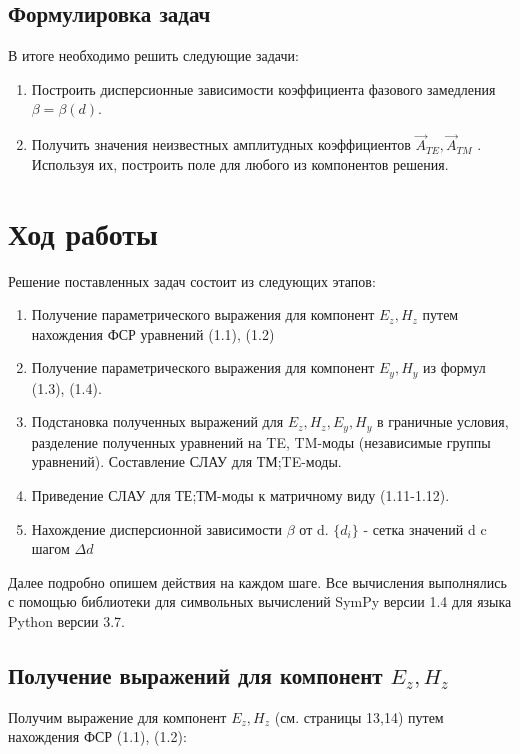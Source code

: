 \documentclass{article}
\begin{document}
\subsection{Формулировка задач}

В итоге необходимо решить следующие задачи:
\begin{enumerate}
    \item Построить дисперсионные зависимости коэффициента фазового замедления $\beta = \beta(d)$.
    \item Получить значения неизвестных амплитудных коэффициентов $\vec{A}_{TE}, \vec{A}_{TM}$ . Используя их, построить поле для любого из компонентов решения.
\end{enumerate}

\newpage

\section{Ход работы}

Решение поставленных задач состоит из следующих этапов:
\begin{enumerate}
    \item Получение параметрического выражения для компонент $E_z, H_z$ путем нахождения ФСР уравнений (1.1), (1.2)
    \item Получение параметрического выражения для компонент $E_y, H_y$ из формул (1.3), (1.4).
    \item Подстановка полученных выражений для $E_z, H_z, E_y, H_y$ в граничные условия, разделение полученных уравнений на TE, TM-моды (независимые группы уравнений). Составление СЛАУ для ТМ;TE-моды.
    \item Приведение СЛАУ для ТЕ;ТМ-моды  к матричному виду (1.11-1.12). 
    \item Нахождение дисперсионной зависимости $\beta$ от d. $\{ d_i \}$ - сетка значений d c шагом $\Delta d$
\end{enumerate}

Далее подробно опишем действия на каждом шаге. Все вычисления выполнялись с помощью библиотеки для символьных вычислений SymPy версии 1.4 для языка Python версии 3.7.

\subsection{Получение выражений для компонент $E_z, H_z$}
Получим выражение для компонент $E_z, H_z$ (см. страницы 13,14) путем нахождения ФСР (1.1), (1.2):
\end{document}
